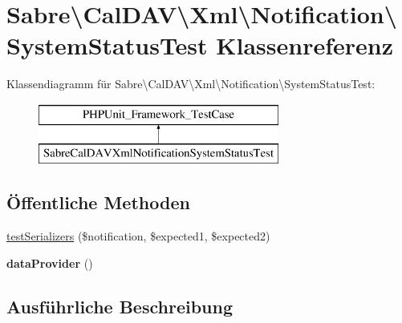\hypertarget{class_sabre_1_1_cal_d_a_v_1_1_xml_1_1_notification_1_1_system_status_test}{}\section{Sabre\textbackslash{}Cal\+D\+AV\textbackslash{}Xml\textbackslash{}Notification\textbackslash{}System\+Status\+Test Klassenreferenz}
\label{class_sabre_1_1_cal_d_a_v_1_1_xml_1_1_notification_1_1_system_status_test}
Klassendiagramm für Sabre\textbackslash{}Cal\+D\+AV\textbackslash{}Xml\textbackslash{}Notification\textbackslash{}System\+Status\+Test\+:\begin{figure}[H]
\begin{center}
\leavevmode
\includegraphics[height=2.000000cm]{class_sabre_1_1_cal_d_a_v_1_1_xml_1_1_notification_1_1_system_status_test}
\end{center}
\end{figure}
\subsection*{Öffentliche Methoden}
\begin{DoxyCompactItemize}
\item 
\mbox{\hyperlink{class_sabre_1_1_cal_d_a_v_1_1_xml_1_1_notification_1_1_system_status_test_afdccb11e53d5e92651d08164e136e6a6}{test\+Serializers}} (\$notification, \$expected1, \$expected2)
\item 
\mbox{\label{class_sabre_1_1_cal_d_a_v_1_1_xml_1_1_notification_1_1_system_status_test_a0cf4bdbca069128f91cd3ca4dacb196d}} 
{\bfseries data\+Provider} ()
\end{DoxyCompactItemize}


\subsection{Ausführliche Beschreibung}


